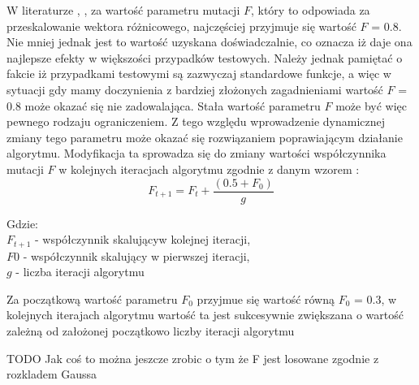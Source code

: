 W literaturze \cite{przystojny_koles}, \cite{czynnik}, za wartość parametru mutacji $F$, który to odpowiada za przeskalowanie wektora różnicowego, najczęściej przyjmuje się wartość $F$ = 0.8. Nie mniej jednak jest to wartość uzyskana doświadczalnie, co oznacza iż daje ona najlepsze efekty w większości przypadków testowych. Należy jednak pamiętać o fakcie iż przypadkami testowymi są zazwyczaj standardowe funkcje, a więc w sytuacji gdy mamy doczynienia z bardziej złożonych zagadnieniami wartość $F$ = 0.8 może okazać się nie zadowalająca. Stała wartość parametru $F$ może być więc pewnego rodzaju ograniczeniem. Z tego względu wprowadzenie dynamicznej zmiany tego parametru może okazać się rozwiązaniem poprawiającym działanie algorytmu. Modyfikacja ta sprowadza się do zmiany wartości współczynnika mutacji $F$ w kolejnych iteracjach algorytmu zgodnie z danym wzorem \cite{doktorat}:
$$
F_{t+1} = F_{t} + \frac{(0.5 + F_0)}{g}
$$
\par
Gdzie:\\
$F_{t+1}$ - współczynnik skalującyw kolejnej iteracji,\\
$F{0}$ - współczynnik skalujący w pierwszej iteracji,\\
$g$ - liczba iteracji algorytmu\\
\par
Za początkową wartość parametru $F_{0}$ przyjmue się wartość równą $F_{0}$ = 0.3, w kolejnych iterajach algorytmu wartość ta jest sukcesywnie zwiększana o wartość zależną od założonej początkowo liczby iteracji algorytmu
\par
TODO
Jak coś to można jeszcze zrobic o tym że F jest losowane zgodnie z rozkladem Gaussa


































